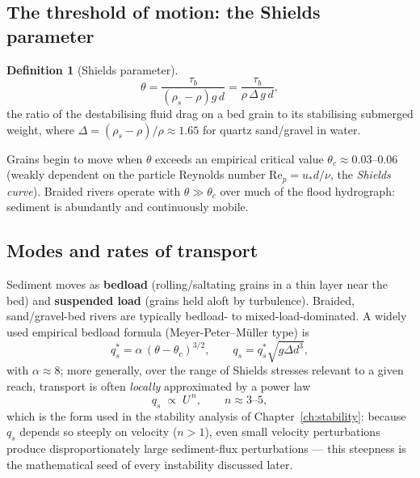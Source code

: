 \documentclass[11pt,a4paper]{report}
\theoremstyle{definition}
\newtheorem{definition}{Definition}[chapter]
\theoremstyle{plain}
\theoremstyle{remark}
\renewcommand{\Re}{\mathrm{Re}}
\begin{document}
\subsection{The threshold of motion: the Shields parameter}
\begin{definition}[Shields parameter]
\begin{equation}
\theta = \frac{\tau_b}{(\rho_s-\rho)g\,d} = \frac{\tau_b}{\rho\, \Delta\, g\, d},
\label{eq:shields}
\end{equation}
the ratio of the destabilising fluid drag on a bed grain to its stabilising submerged weight, where $\Delta=(\rho_s-\rho)/\rho\approx1.65$ for quartz sand/gravel in water.
\end{definition}
Grains begin to move when $\theta$ exceeds an empirical critical value $\theta_c\approx0.03$--$0.06$ (weakly dependent on the particle Reynolds number $\Re_p=u_*d/\nu$, the \emph{Shields curve}). Braided rivers operate with $\theta \gg \theta_c$ over much of the flood hydrograph: sediment is abundantly and continuously mobile.

\subsection{Modes and rates of transport}
Sediment moves as \textbf{bedload} (rolling/saltating grains in a thin layer near the bed) and \textbf{suspended load} (grains held aloft by turbulence). Braided, sand/gravel-bed rivers are typically bedload- to mixed-load-dominated. A widely used empirical bedload formula (Meyer-Peter--Müller type) is
\begin{equation}
q_s^* = \alpha\,(\theta-\theta_c)^{3/2}, \qquad q_s = q_s^*\sqrt{g\Delta d^3},
\label{eq:MPM}
\end{equation}
with $\alpha\approx 8$; more generally, over the range of Shields stresses relevant to a given reach, transport is often \emph{locally} approximated by a power law
\begin{equation}
q_s \;\propto\; U^{\,n}, \qquad n \approx 3\text{--}5,
\label{eq:powerlaw}
\end{equation}
which is the form used in the stability analysis of Chapter~\ref{ch:stability}: because $q_s$ depends so steeply on velocity ($n>1$), even small velocity perturbations produce disproportionately large sediment-flux perturbations --- this steepness is the mathematical seed of every instability discussed later.
\end{document}
